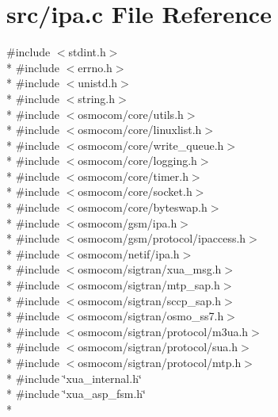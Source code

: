 \section{src/ipa.c File Reference}
\label{ipa_8c}
{\ttfamily \#include $<$stdint.\+h$>$}\\*
{\ttfamily \#include $<$errno.\+h$>$}\\*
{\ttfamily \#include $<$unistd.\+h$>$}\\*
{\ttfamily \#include $<$string.\+h$>$}\\*
{\ttfamily \#include $<$osmocom/core/utils.\+h$>$}\\*
{\ttfamily \#include $<$osmocom/core/linuxlist.\+h$>$}\\*
{\ttfamily \#include $<$osmocom/core/write\+\_\+queue.\+h$>$}\\*
{\ttfamily \#include $<$osmocom/core/logging.\+h$>$}\\*
{\ttfamily \#include $<$osmocom/core/timer.\+h$>$}\\*
{\ttfamily \#include $<$osmocom/core/socket.\+h$>$}\\*
{\ttfamily \#include $<$osmocom/core/byteswap.\+h$>$}\\*
{\ttfamily \#include $<$osmocom/gsm/ipa.\+h$>$}\\*
{\ttfamily \#include $<$osmocom/gsm/protocol/ipaccess.\+h$>$}\\*
{\ttfamily \#include $<$osmocom/netif/ipa.\+h$>$}\\*
{\ttfamily \#include $<$osmocom/sigtran/xua\+\_\+msg.\+h$>$}\\*
{\ttfamily \#include $<$osmocom/sigtran/mtp\+\_\+sap.\+h$>$}\\*
{\ttfamily \#include $<$osmocom/sigtran/sccp\+\_\+sap.\+h$>$}\\*
{\ttfamily \#include $<$osmocom/sigtran/osmo\+\_\+ss7.\+h$>$}\\*
{\ttfamily \#include $<$osmocom/sigtran/protocol/m3ua.\+h$>$}\\*
{\ttfamily \#include $<$osmocom/sigtran/protocol/sua.\+h$>$}\\*
{\ttfamily \#include $<$osmocom/sigtran/protocol/mtp.\+h$>$}\\*
{\ttfamily \#include \char`\"{}xua\+\_\+internal.\+h\char`\"{}}\\*
{\ttfamily \#include \char`\"{}xua\+\_\+asp\+\_\+fsm.\+h\char`\"{}}\\*
